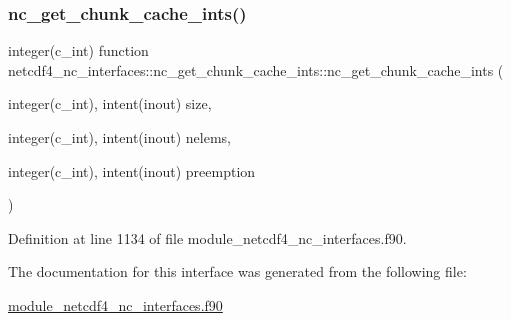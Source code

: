\subsubsection{\texorpdfstring{nc\+\_\+get\+\_\+chunk\+\_\+cache\+\_\+ints()}{nc\_get\_chunk\_cache\_ints()}}
{\footnotesize\ttfamily integer(c\+\_\+int) function netcdf4\+\_\+nc\+\_\+interfaces\+::nc\+\_\+get\+\_\+chunk\+\_\+cache\+\_\+ints\+::nc\+\_\+get\+\_\+chunk\+\_\+cache\+\_\+ints (\begin{DoxyParamCaption}\item[{integer(c\+\_\+int), intent(inout)}]{size,  }\item[{integer(c\+\_\+int), intent(inout)}]{nelems,  }\item[{integer(c\+\_\+int), intent(inout)}]{preemption }\end{DoxyParamCaption})}



Definition at line 1134 of file module\+\_\+netcdf4\+\_\+nc\+\_\+interfaces.\+f90.



The documentation for this interface was generated from the following file\+:\begin{DoxyCompactItemize}
\item 
\hyperlink{module__netcdf4__nc__interfaces_8f90}{module\+\_\+netcdf4\+\_\+nc\+\_\+interfaces.\+f90}\end{DoxyCompactItemize}
